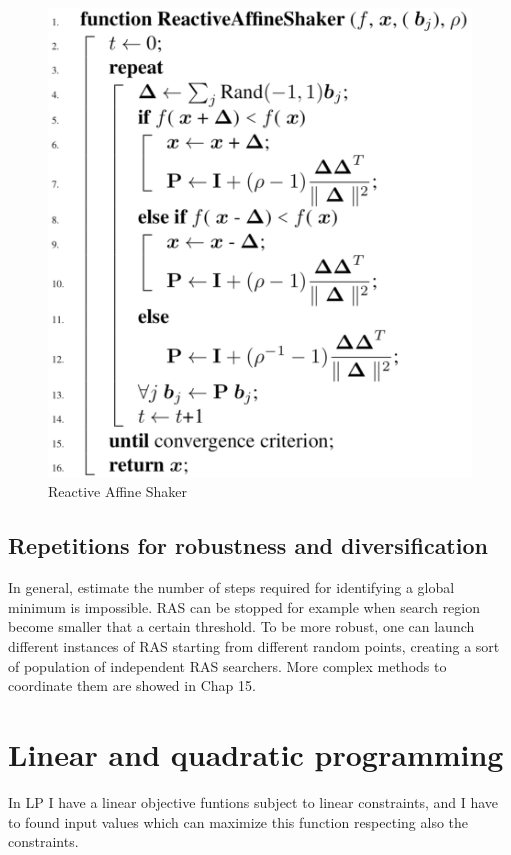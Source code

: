 \documentclass[10pt]{article}
\begin{document}
\begin{figure}[H]
\includegraphics[scale=0.25]{ras}
\caption{Reactive Affine Shaker}
\centering
\label{fig:ras}
\end{figure}

\subsection{Repetitions for robustness and diversification}

In general, estimate the number of steps required for identifying a global minimum is impossible. RAS can be stopped for example when search region become smaller that a certain threshold. To be more robust, one can launch different instances of RAS starting from different random points, creating a sort of population of independent RAS searchers. More complex methods to coordinate them are showed in Chap 15.

\section{Linear and quadratic programming}

In LP I have a linear objective funtions subject to linear constraints, and I have to found input values which can maximize this function respecting also the constraints. 
\end{document}
